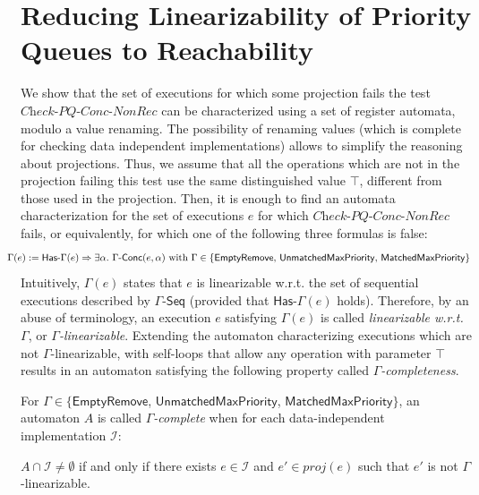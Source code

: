 \section{Reducing Linearizability of Priority Queues to Reachability}
\label{sec:co-regular of extended priority queues}

We show that the set of executions for which some projection fails the test $\textit{Check-PQ-Conc-NonRec}$ can be characterized using a set of register automata, modulo a value renaming. The possibility of renaming values (which is complete for checking data independent implementations) allows to simplify the reasoning about projections. Thus, we assume that all the operations which are not in the projection failing this test use the same distinguished value $\top$, different from those used in the projection. Then, it is enough to find an automata characterization for the set of executions $e$ for which $\textit{Check-PQ-Conc-NonRec}$ fails, or equivalently, for which one
of the following three formulas is false:
\begin{align*}
\hspace{-5mm}
\Gamma(e) := \mathsf{Has\text{-}}\Gamma(e) \Rightarrow \exists \alpha.\ \Gamma\mathsf{\text{-}Conc}(e,\alpha)\mbox{ with $\Gamma\in \{\mathsf{EmptyRemove}$, $\mathsf{UnmatchedMaxPriority}$, $\mathsf{MatchedMaxPriority}\}$}
\end{align*}
Intuitively, $\Gamma(e)$ states that $e$ is linearizable w.r.t. the set of sequential executions described by $\Gamma\mathsf{\text{-}Seq}$ (provided that $\mathsf{Has\text{-}}\Gamma(e)$ holds). Therefore, by an abuse of terminology, an execution $e$ satisfying $\Gamma(e)$ is called \emph{linearizable w.r.t. $\Gamma$}, or \emph{$\Gamma$-linearizable}.
Extending the automaton characterizing executions which are not $\Gamma$-linearizable, with self-loops that allow any operation with parameter $\top$ results in an automaton satisfying the following property called \emph{$\Gamma$-completeness}.

\begin{definition}
For $\Gamma\in \{\mathsf{EmptyRemove}$, $\mathsf{UnmatchedMaxPriority}$, $\mathsf{MatchedMaxPriority}\}$, an automaton $A$ is called \emph{$\Gamma$-complete} when for each data-independent implementation $\mathcal{I}$:

$A \cap \mathcal{I} \neq \emptyset$ if and only if there exists $ e \in \mathcal{I}$ and $e' \in \textit{proj}(e)$ such that $e'$ is not $\Gamma$-linearizable.
\end{definition}


